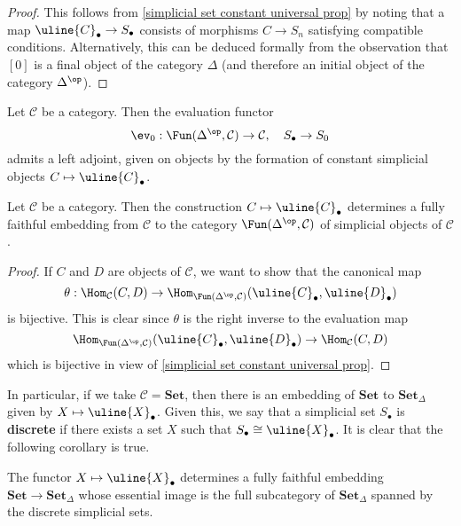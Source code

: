 \begin{proof}
This follows from \cref{simplicial set constant universal prop} by noting that a map $\uline{C}_\bullet\to S_\bullet$ consists of morphisms $C\to S_n$ satisfying compatible conditions. Alternatively, this can be deduced formally from the observation that $[0]$ is a final object of the category $\Delta$ (and therefore an initial object of the category $\Delta^{\op}$).
\end{proof}
\begin{corollary}\label{simplicial set evaluation adjoint to constant functor}
Let $\mathcal{C}$ be a category. Then the evaluation functor
\[\ev_0:\Fun(\Delta^{\op},\mathcal{C})\to\mathcal{C},\quad S_\bullet\to S_0\]
admits a left adjoint, given on objects by the formation of constant simplicial objects $C\mapsto\uline{C}_\bullet$.
\end{corollary}
\begin{corollary}\label{simplicial set constant functor is embedding}
Let $\mathcal{C}$ be a category. Then the construction $C\mapsto\uline{C}_\bullet$ determines a fully faithful embedding from $\mathcal{C}$ to the category $\Fun(\Delta^{\op},\mathcal{C})$ of simplicial objects of $\mathcal{C}$.
\end{corollary}
\begin{proof}
If $C$ and $D$ are objects of $\mathcal{C}$, we want to show that the canonical map
\[\theta:\Hom_{\mathcal{C}}(C,D)\to\Hom_{\Fun(\Delta^{\op},\mathcal{C})}(\uline{C}_\bullet,\uline{D}_\bullet)\]
is bijective. This is clear since $\theta$ is the right inverse to the evaluation map
\[\Hom_{\Fun(\Delta^{\op},\mathcal{C})}(\uline{C}_\bullet,\uline{D}_\bullet)\to\Hom_{\mathcal{C}}(C,D)\]
which is bijective in view of \cref{simplicial set constant universal prop}.
\end{proof}
In particular, if we take $\mathcal{C}=\mathbf{Set}$, then there is an embedding of $\mathbf{Set}$ to $\mathbf{Set}_{\Delta}$ given by $X\mapsto\uline{X}_\bullet$. Given this, we say that a simplicial set $S_\bullet$ is \textbf{discrete} if there exists a set $X$ such that $S_\bullet\cong\uline{X}_\bullet$. It is clear that the following corollary is true.
\begin{corollary}\label{simplicial set constant functor image is discrete}
The functor $X\mapsto\uline{X}_\bullet$ determines a fully faithful embedding $\mathbf{Set}\to\mathbf{Set}_{\Delta}$ whose essential image is the full subcategory of $\mathbf{Set}_\Delta$ spanned by the discrete simplicial sets.
\end{corollary}
